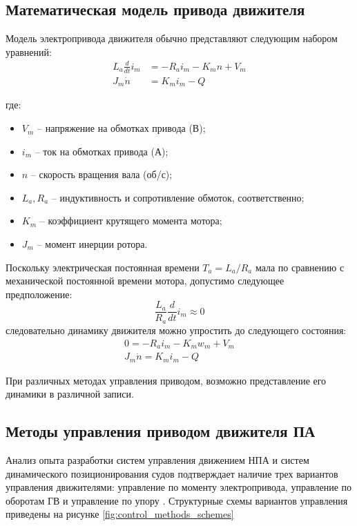 \subsection{Математическая модель привода движителя}

Модель электропривода движителя обычно представляют следующим набором уравнений:
\begin{equation}
	\label{eq:motor_model}
	\begin{array}{ll}
	L_a\frac{d}{dt}i_m &=-R_ai_m-K_m n + V_m \\
    J_m\dot{n} &= K_m i_m - Q
	\end{array}
\end{equation}

\noindent где:
\begin{itemize}
    \item $V_m$ -- напряжение на обмотках привода (В);
    \item $i_m$ -- ток на обмотках привода (А);
    \item $n$ -- скорость вращения вала (об/с);
    \item $L_a, R_a$ -- индуктивность и сопротивление обмоток, соответственно;
    \item $K_m$ -- коэффициент крутящего момента мотора;
    \item $J_m$ -- момент инерции ротора.
\end{itemize}

Поскольку электрическая постоянная времени $T_a=L_a/R_a$ мала по сравнению с механической постоянной времени мотора, допустимо следующее предположение:
\begin{equation}
    \frac{L_a}{R_a}\frac{d}{dt}i_m \approx 0
\end{equation}
\noindent следовательно динамику движителя можно упростить до следующего состояния:
\begin{gather}
    \label{eq:motor_dynamics}
    0 = -R_a i_m-K_m w_m + V_m \\
    J_m\dot{n} = K_m i_m - Q
\end{gather}

При различных методах управления приводом, возможно представление его динамики в различной записи.

\subsection{Методы управления приводом движителя ПА}
Анализ опыта разработки систем управления движением НПА и систем динамического позиционирования судов подтверждает наличие трех вариантов управления движителями: управление по моменту электропривода, управление по оборотам ГВ и управление по упору \cite{костенко2020исследование, костенко2019разработка, sorensen20003}.
Структурные схемы вариантов управления приведены на рисунке \ref{fig:control_methods_schemes}

